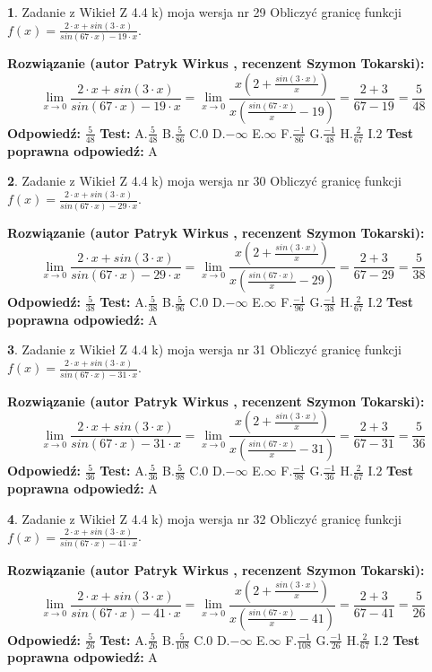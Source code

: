 \documentclass[12pt, a4paper]{article}
\theoremstyle{definition} %
\newtheorem{zad}{}
\newcommand{\zadStart}[1]{\begin{zad}#1\newline}
\newcommand{\zadStop}{\end{zad}}
\newcommand{\rozwStart}[2]{\noindent \textbf{Rozwiązanie (autor #1 , recenzent #2): }\newline}
\newcommand{\rozwStop}{\newline}
\newcommand{\odpStart}{\noindent \textbf{Odpowiedź:}\newline}
\newcommand{\odpStop}{\newline}
\newcommand{\testStart}{\noindent \textbf{Test:}\newline}
\newcommand{\testStop}{\newline}
\newcommand{\kluczStart}{\noindent \textbf{Test poprawna odpowiedź:}\newline}
\newcommand{\kluczStop}{\newline}
\begin{document}
\zadStart{Zadanie z Wikieł Z 4.4 k) moja wersja nr 29}
Obliczyć granicę funkcji $f(x)=\frac{2\cdot x +sin(3\cdot x)}{sin(67\cdot x) -19\cdot x}$.
\zadStop
\rozwStart{Patryk Wirkus}{Szymon Tokarski}
$$\lim\limits_{x\to 0}\frac{2\cdot x +sin(3\cdot x)}{sin(67\cdot x) -19\cdot x}
=\lim\limits_{x\to 0}\frac{x(2+\frac{sin(3\cdot x)}{x})}{x(\frac{sin(67\cdot x)}{x}-19)}
=\frac{2+3}{67-19} = \frac{5}{48}$$
\rozwStop
\odpStart
$\frac{5}{48}$
\odpStop
\testStart
A.$\frac{5}{48}$
B.$\frac{5}{86}$
C.$0$
D.$-\infty$
E.$\infty$
F.$\frac{-1}{86}$
G.$\frac{-1}{48}$
H.$\frac{2}{67}$
I.$2$
\testStop
\kluczStart
A
\kluczStop



\zadStart{Zadanie z Wikieł Z 4.4 k) moja wersja nr 30}
Obliczyć granicę funkcji $f(x)=\frac{2\cdot x +sin(3\cdot x)}{sin(67\cdot x) -29\cdot x}$.
\zadStop
\rozwStart{Patryk Wirkus}{Szymon Tokarski}
$$\lim\limits_{x\to 0}\frac{2\cdot x +sin(3\cdot x)}{sin(67\cdot x) -29\cdot x}
=\lim\limits_{x\to 0}\frac{x(2+\frac{sin(3\cdot x)}{x})}{x(\frac{sin(67\cdot x)}{x}-29)}
=\frac{2+3}{67-29} = \frac{5}{38}$$
\rozwStop
\odpStart
$\frac{5}{38}$
\odpStop
\testStart
A.$\frac{5}{38}$
B.$\frac{5}{96}$
C.$0$
D.$-\infty$
E.$\infty$
F.$\frac{-1}{96}$
G.$\frac{-1}{38}$
H.$\frac{2}{67}$
I.$2$
\testStop
\kluczStart
A
\kluczStop



\zadStart{Zadanie z Wikieł Z 4.4 k) moja wersja nr 31}
Obliczyć granicę funkcji $f(x)=\frac{2\cdot x +sin(3\cdot x)}{sin(67\cdot x) -31\cdot x}$.
\zadStop
\rozwStart{Patryk Wirkus}{Szymon Tokarski}
$$\lim\limits_{x\to 0}\frac{2\cdot x +sin(3\cdot x)}{sin(67\cdot x) -31\cdot x}
=\lim\limits_{x\to 0}\frac{x(2+\frac{sin(3\cdot x)}{x})}{x(\frac{sin(67\cdot x)}{x}-31)}
=\frac{2+3}{67-31} = \frac{5}{36}$$
\rozwStop
\odpStart
$\frac{5}{36}$
\odpStop
\testStart
A.$\frac{5}{36}$
B.$\frac{5}{98}$
C.$0$
D.$-\infty$
E.$\infty$
F.$\frac{-1}{98}$
G.$\frac{-1}{36}$
H.$\frac{2}{67}$
I.$2$
\testStop
\kluczStart
A
\kluczStop



\zadStart{Zadanie z Wikieł Z 4.4 k) moja wersja nr 32}
Obliczyć granicę funkcji $f(x)=\frac{2\cdot x +sin(3\cdot x)}{sin(67\cdot x) -41\cdot x}$.
\zadStop
\rozwStart{Patryk Wirkus}{Szymon Tokarski}
$$\lim\limits_{x\to 0}\frac{2\cdot x +sin(3\cdot x)}{sin(67\cdot x) -41\cdot x}
=\lim\limits_{x\to 0}\frac{x(2+\frac{sin(3\cdot x)}{x})}{x(\frac{sin(67\cdot x)}{x}-41)}
=\frac{2+3}{67-41} = \frac{5}{26}$$
\rozwStop
\odpStart
$\frac{5}{26}$
\odpStop
\testStart
A.$\frac{5}{26}$
B.$\frac{5}{108}$
C.$0$
D.$-\infty$
E.$\infty$
F.$\frac{-1}{108}$
G.$\frac{-1}{26}$
H.$\frac{2}{67}$
I.$2$
\testStop
\kluczStart
A
\kluczStop
\end{document}

